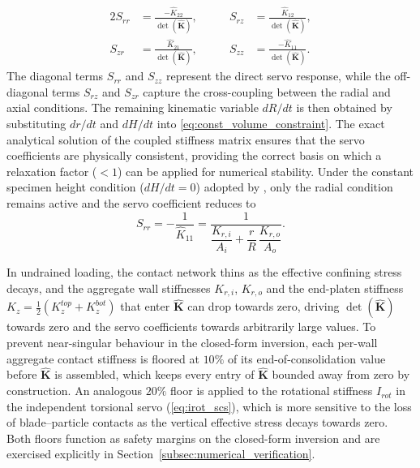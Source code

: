 \documentclass[a4paper,fleqn]{cas-sc}
\begin{document}
\begin{alignat}{2}
S_{rr} &= \frac{-\hat{K}_{22}}{\det(\hat{\mathbf{K}})}, &\qquad
S_{rz} &= \frac{\hat{K}_{12}}{\det(\hat{\mathbf{K}})}, \label{eq:servo_coeff_r}\\[4pt]
S_{zr} &= \frac{\hat{K}_{21}}{\det(\hat{\mathbf{K}})}, &\qquad
S_{zz} &= \frac{-\hat{K}_{11}}{\det(\hat{\mathbf{K}})}. \label{eq:servo_coeff_z}
\end{alignat}
The diagonal terms $S_{rr}$ and $S_{zz}$ represent the direct servo response, while the off-diagonal terms $S_{rz}$ and $S_{zr}$ capture the cross-coupling between the radial and axial conditions. The remaining kinematic variable $dR/dt$ is then obtained by substituting $dr/dt$ and $dH/dt$ into \cref{eq:const_volume_constraint}. The exact analytical solution of the coupled stiffness matrix ensures that the servo coefficients are physically consistent, providing the correct basis on which a relaxation factor ($<1$) can be applied for numerical stability. Under the constant specimen height condition ($dH/dt=0$) adopted by \citet{Han2024jgs}, only the radial condition remains active and the servo coefficient reduces to
\begin{equation}
S_{rr} = -\frac{1}{\hat{K}_{11}} = \frac{1}{\dfrac{K_{r,i}}{A_i}+\dfrac{r}{R}\,\dfrac{K_{r,o}}{A_o}}.
\label{eq:Srr_constantH_main}
\end{equation}

In undrained loading, the contact network thins as the effective confining stress decays, and the aggregate wall stiffnesses $K_{r,i}$, $K_{r,o}$ and the end-platen stiffness $K_z=\tfrac{1}{2}(K_z^{top}+K_z^{bot})$ that enter $\hat{\mathbf{K}}$ can drop towards zero, driving $\det(\hat{\mathbf{K}})$ towards zero and the servo coefficients towards arbitrarily large values. To prevent near-singular behaviour in the closed-form inversion, each per-wall aggregate contact stiffness is floored at $10\%$ of its end-of-consolidation value before $\hat{\mathbf{K}}$ is assembled, which keeps every entry of $\hat{\mathbf{K}}$ bounded away from zero by construction. An analogous $20\%$ floor is applied to the rotational stiffness $I_{rot}$ in the independent torsional servo (\cref{eq:irot_scs}), which is more sensitive to the loss of blade--particle contacts as the vertical effective stress decays towards zero. Both floors function as safety margins on the closed-form inversion and are exercised explicitly in Section~\ref{subsec:numerical_verification}.
\end{document}
